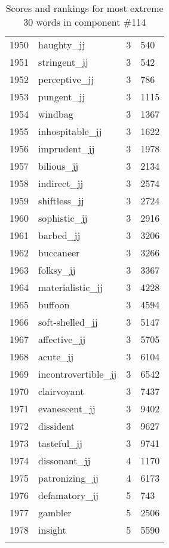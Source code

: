 \begin{longtable}[!htbp]{| rlr@{.}l |}
    1950 & haughty\_jj & 3 & 540 \\
    1951 & stringent\_jj & 3 & 542 \\
    1952 & perceptive\_jj & 3 & 786 \\
    1953 & pungent\_jj & 3 & 1115 \\
    1954 & windbag & 3 & 1367 \\
    1955 & inhospitable\_jj & 3 & 1622 \\
    1956 & imprudent\_jj & 3 & 1978 \\
    1957 & bilious\_jj & 3 & 2134 \\
    1958 & indirect\_jj & 3 & 2574 \\
    1959 & shiftless\_jj & 3 & 2724 \\
    1960 & sophistic\_jj & 3 & 2916 \\
    1961 & barbed\_jj & 3 & 3206 \\
    1962 & buccaneer & 3 & 3266 \\
    1963 & folksy\_jj & 3 & 3367 \\
    1964 & materialistic\_jj & 3 & 4228 \\
    1965 & buffoon & 3 & 4594 \\
    1966 & soft-shelled\_jj & 3 & 5147 \\
    1967 & affective\_jj & 3 & 5705 \\
    1968 & acute\_jj & 3 & 6104 \\
    1969 & incontrovertible\_jj & 3 & 6542 \\
    1970 & clairvoyant & 3 & 7437 \\
    1971 & evanescent\_jj & 3 & 9402 \\
    1972 & dissident & 3 & 9627 \\
    1973 & tasteful\_jj & 3 & 9741 \\
    1974 & dissonant\_jj & 4 & 1170 \\
    1975 & patronizing\_jj & 4 & 6173 \\
    1976 & defamatory\_jj & 5 & 743 \\
    1977 & gambler & 5 & 2506 \\
    1978 & insight & 5 & 5590 \\
    \hline
    \caption{Scores and rankings for most extreme 30 words in component \#114} \\
\end{longtable}

